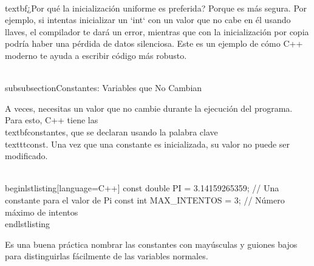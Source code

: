 \\textbf{¿Por qué la inicialización uniforme es preferida?}
Porque es más segura. Por ejemplo, si intentas inicializar un `int` con un valor que no cabe en él usando llaves, el compilador te dará un error, mientras que con la inicialización por copia podría haber una pérdida de datos silenciosa. Este es un ejemplo de cómo C++ moderno te ayuda a escribir código más robusto.

\\subsubsection{Constantes: Variables que No Cambian}

A veces, necesitas un valor que no cambie durante la ejecución del programa. Para esto, C++ tiene las \\textbf{constantes}, que se declaran usando la palabra clave \\texttt{const}. Una vez que una constante es inicializada, su valor no puede ser modificado.

\\begin{lstlisting}[language=C++]
const double PI = 3.14159265359; // Una constante para el valor de Pi
const int MAX_INTENTOS = 3; // Número máximo de intentos
\\end{lstlisting}

Es una buena práctica nombrar las constantes con mayúsculas y guiones bajos para distinguirlas fácilmente de las variables normales.

